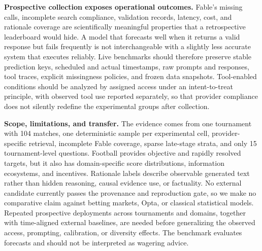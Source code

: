 \begin{draftbullets}
  \item \textbf{Prospective collection exposes operational outcomes.} Fable's missing calls,
  incomplete search compliance, validation records, latency, cost, and rationale coverage are
  scientifically meaningful properties that a retrospective leaderboard would hide. A model that
  forecasts well when it returns a valid response but fails frequently is not interchangeable with a
  slightly less accurate system that executes reliably. Live benchmarks should therefore preserve
  stable prediction keys, scheduled and actual timestamps, raw prompts and responses, tool traces,
  explicit missingness policies, and frozen data snapshots. Tool-enabled conditions should be analyzed
  by assigned access under an intent-to-treat principle, with observed tool use reported separately,
  so that provider compliance does not silently redefine the experimental groups after collection.

  \item \textbf{Scope, limitations, and transfer.} The evidence comes from one tournament with 104
  matches, one deterministic sample per experimental cell, provider-specific retrieval, incomplete
  Fable coverage, sparse late-stage strata, and only 15 tournament-level questions. Football provides
  objective and rapidly resolved targets, but it also has domain-specific score distributions,
  information ecosystems, and incentives. Rationale labels describe observable generated text rather
  than hidden reasoning, causal evidence use, or factuality. No external candidate currently passes
  the provenance and reproduction gate, so we make no comparative claim against betting markets,
  Opta, or classical statistical models. Repeated prospective deployments across tournaments and
  domains, together with time-aligned external baselines, are needed before generalizing the observed
  access, prompting, calibration, or diversity effects. The benchmark evaluates forecasts and should
  not be interpreted as wagering advice.
\end{draftbullets}

